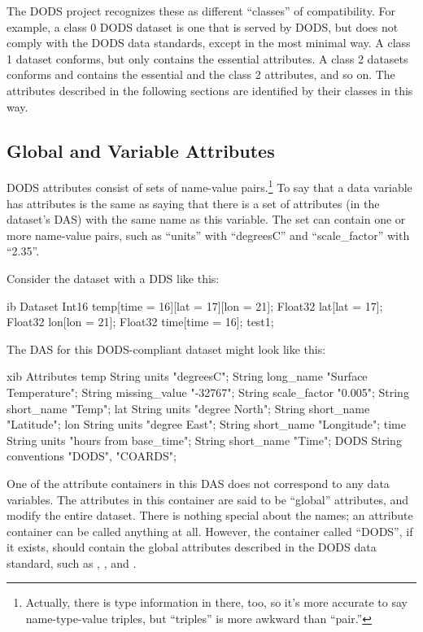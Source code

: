 The DODS project recognizes these as different ``classes'' of
compatibility.  For example, a class 0 DODS dataset is one that is
served by DODS, but does not comply with the DODS data standards,
except in the most minimal way.  A class 1 dataset conforms, but only
contains the essential attributes.  A class 2 datasets conforms and
contains the essential and the class 2 attributes, and so on.  The
attributes described in the following sections are identified by their
classes in this way.


\subsection{Global and Variable Attributes}

DODS attributes consist of sets of name-value
pairs.\footnote{Actually, there is type information in there, too, so
  it's more accurate to say name-type-value triples, but ``triples''
  is more awkward than ``pair.''}  To say that a data variable has
attributes is the same as saying that there is a set of attributes (in
the dataset's DAS) with the same name as this variable.  The set can
contain one or more name-value pairs, such as ``units'' with
``degreesC'' and ``scale\_factor'' with ``2.35''.

Consider the dataset with a DDS like this:

\begin{vcode}{ib}
Dataset {
  Int16 temp[time = 16][lat = 17][lon = 21];
  Float32 lat[lat = 17];
  Float32 lon[lon = 21];
  Float32 time[time = 16];
} test1;
\end{vcode}

The DAS for this DODS-compliant dataset might look like this:

\begin{vcode}{xib}
Attributes {
  temp {
      String units "degreesC";
      String long_name "Surface Temperature";
      String missing_value "-32767";
      String scale_factor "0.005";
      String short_name "Temp";
  }
  lat {
      String units "degree North";
      String short_name "Latitude";
  }
  lon {
      String units "degree East";
      String short_name "Longitude";
  }
  time {
      String units "hours from base_time";
      String short_name "Time";
  }
  DODS {
      String conventions "DODS", "COARDS";
  }
}
\end{vcode}

One of the attribute containers in this DAS does not correspond to any
data variables.  The attributes in this container are said to be
``global'' attributes, and modify the entire dataset.  There is
nothing special about the names; an attribute container can be called
anything at all.  However, the container called ``DODS'', if it
exists, should contain the global attributes described in the DODS
data standard, such as , , and
.


